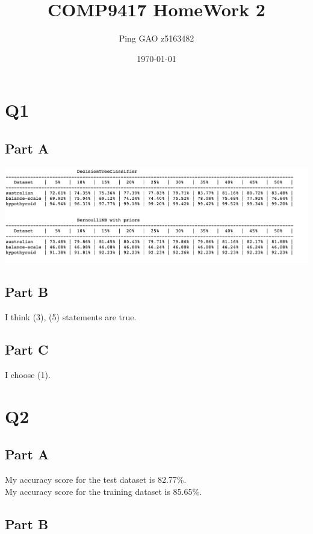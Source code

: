 \documentclass[12pt]{article}
\title{COMP9417 HomeWork 2}
\author{Ping GAO z5163482}
\date{\today}
\begin{document}
    \maketitle
    \section{Q1}\label{sec:q1}
    \subsection{Part A}\label{subsec:part-a}
    \includegraphics[scale=0.18]{result.jpeg}
    \subsection{Part B}\label{subsec:part-b}
    I think (3), (5) statements are true.
    \subsection{Part C}\label{subsec:part-c}
    I choose (1).
    \section{Q2}\label{sec:q2}
    \subsection{Part A}\label{subsec:part-a2}
    My accuracy score for the test dataset is 82.77\%. \\
    My accuracy score for the training dataset is 85.65\%.
    \subsection{Part B}\label{subsec:part-b2}
\end{document}
